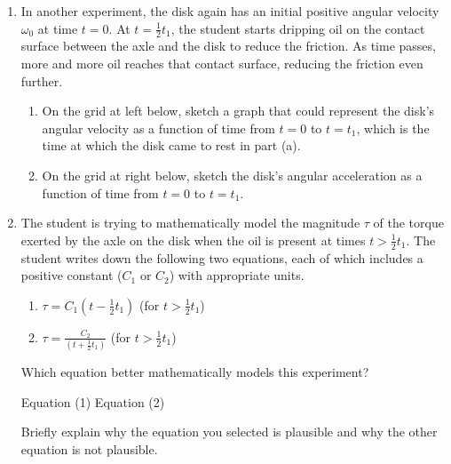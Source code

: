 \documentclass{../../../oss-classkick}
\begin{document}
\begin{enumerate}
\begin{enumerate}[leftmargin=15pt]
  \item In another experiment, the disk again has an initial positive angular
    velocity $\omega_0$ at time $t=0$. At $\displaystyle t=\frac12t_1$, the
    student starts dripping oil on the contact surface between the axle and the
    disk to reduce the friction. As time passes, more and more oil reaches that
    contact surface, reducing the friction even further.
    \begin{enumerate}
    \item On the grid at left below, sketch a graph that could represent the
      disk's angular velocity as a function of time from $t=0$ to $t=t_1$,
      which is the time at which the disk came to rest in part (a).
    \item On the grid at right below, sketch the disk's angular acceleration
      as a function of time from $t=0$ to $t=t_1$.
    \end{enumerate}
    
   \item The student is trying to mathematically model the magnitude $\tau$ of
     the torque exerted by the axle on the disk when the oil is present at
     times $\displaystyle t>\frac12t_1$. The student writes down the following
     two equations, each of which includes a positive constant ($C_1$ or $C_2$)
     with appropriate units.
     \begin{enumerate}[label={(\arabic*)},leftmargin=15pt]
     \item$\displaystyle\tau=C_1\left(t-\frac12t_1\right)$ (for $t>\frac12 t_1$)
     \item$\displaystyle\tau=\frac{C_2}{\left(t+\frac12t_1\right)}$ (for
       $t>\frac12t_1$)
     \end{enumerate}
     Which equation better mathematically models this experiment?

     \vspace{.1in}
     \underline{\hspace{.3in}}Equation (1)\hspace{.2in}
     \underline{\hspace{.3in}}Equation (2)
     
     \vspace{.1in}Briefly explain why the equation you selected is plausible
     and why the other equation is not plausible.
  \end{enumerate}
\end{enumerate}
\end{document}
